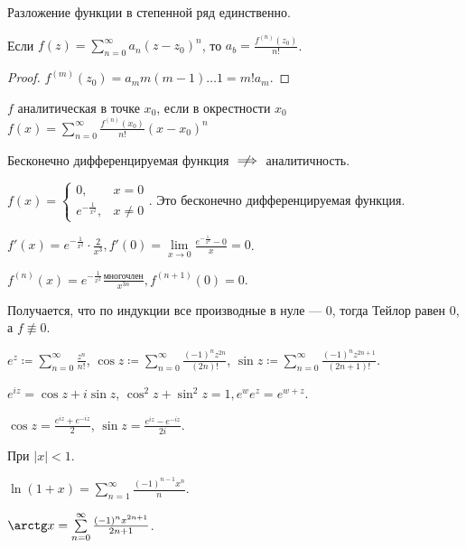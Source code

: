 \begin{theorem}
    Разложение функции в степенной ряд единственно. 

    Если $f(z) = \sum\limits_{n=0}^\infty a_n(z-z_0)^n$, то $a_b = \frac{f^{(n)}(z_0)}{n!}$.
\end{theorem}
\begin{proof}
    $f^{(m)}(z_0) = a_m m(m-1)\ldots 1 = m!a_m$.
\end{proof}
\begin{definition}
    $f$ аналитическая в точке  $x_0$, если в окрестности $x_0$ $f(x) = \sum\limits_{n=0}^\infty \frac{f^{(n)}(x_0)}{n!}(x-x_0)^n$
\end{definition}
\begin{remark}
    Бесконечно дифференцируемая функция $\centernot\implies$ аналитичность. 
\end{remark}
\begin{example}
    $f(x) = \begin{cases} 0, & x = 0\\e^{-\frac{1}{x^2}}, & x \neq 0 \end{cases}$. Это бесконечно дифференцируемая функция. 

    $f'(x) = e^{-\frac{1}{x^2}} \cdot \frac{2}{x^3}, f'(0) = \lim\limits_{x \to 0} \frac{e^{-\frac{1}{x^2}} - 0}{x} = 0$.

    $f^{(n)}(x) = e^{-\frac{1}{x^2}} \frac{\text{многочлен}}{x^{3n}}, f^{(n+1)}(0) = 0$.

    Получается, что по индукции все производные в нуле --- 0, тогда Тейлор равен 0, а $f \not \equiv 0$.
\end{example}
\begin{example}
    $e^z \coloneqq \sum\limits_{n=0}^\infty \frac{z^n}{n!}$, $\cos z \coloneqq \sum\limits_{n=0}^\infty \frac{(-1)^n z^{2n}}{(2n)!}$, $\sin z \coloneqq \sum\limits_{n=0}^\infty \frac{(-1)^n z^{2n+1}}{(2n+1)!}$.
\end{example}
\begin{exerc}
    $e^{iz} = \cos z + i\sin z$,  $\cos^2 z + \sin^2 z = 1, e^w e^z = e^{w+z}$.

    $\cos z = \frac{e^{iz} + e^{-iz}}{2}$, $\sin z = \frac{e^{iz} - e^{-iz}}{2i}$.
\end{exerc}
\begin{example}
    При $|x| < 1$.

    $\ln(1+x) = \sum\limits_{n=1}^\infty \frac{(-1)^{n-1}x^n}{n}$.

    $\arctg x = \sum\limits_{n=0}^\infty \frac{(-1)^n x^{2n+1}}{2n+1}$.
\end{example}
